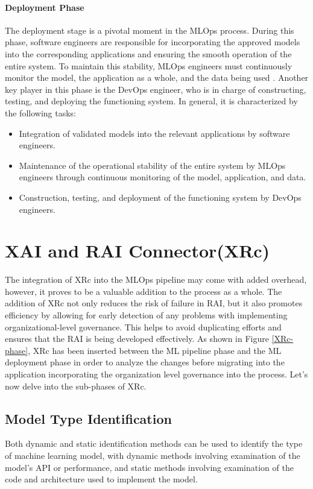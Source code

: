 \documentclass[conference]{IEEEtran}
\begin{document}
\paragraph{Deployment Phase} The deployment stage is a pivotal moment in the MLOps process. During this phase, software engineers are responsible for incorporating the approved models into the corresponding applications and ensuring the smooth operation of the entire system. To maintain this stability, MLOps engineers must continuously monitor the model, the application as a whole, and the data being used \cite{treveil2020introducing}. Another key player in this phase is the DevOps engineer, who is in charge of constructing, testing, and deploying the functioning system. In general, it is characterized by the following tasks:
\begin{itemize}
	\item Integration of validated models into the relevant applications by software engineers.
	\item Maintenance of the operational stability of the entire system by MLOps engineers through continuous monitoring of the model, application, and data.
	\item Construction, testing, and deployment of the functioning system by DevOps engineers.
\end{itemize}

\section{XAI and RAI Connector(XRc)}
The integration of XRc into the MLOps pipeline may come with added overhead, however, it proves to be a valuable addition to the process as a whole. The addition of XRc not only reduces the risk of failure in RAI, but it also promotes efficiency by allowing for early detection of any problems with implementing organizational-level governance. This helps to avoid duplicating efforts and ensures that the RAI is being developed effectively. As shown in Figure \ref{XRc-phase}, XRc has been inserted between the ML pipeline phase and the ML deployment phase in order to analyze the changes before migrating into the application incorporating the organization level governance into the process. Let's now delve into the sub-phases of XRc.

\subsection{Model Type Identification}
Both dynamic and static identification methods can be used to identify the type of machine learning model, with dynamic methods involving examination of the model's API or performance, and static methods involving examination of the code and architecture used to implement the model.
\end{document}

